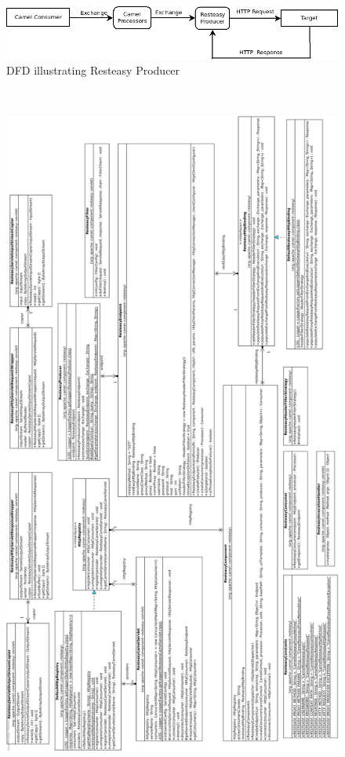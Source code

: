 \documentclass[12pt,final,oneside]{fithesis2}
\begin{document}
\begin{figure}[H]
\includegraphics[width=1.0\linewidth]{diagrams/producer.png}
\caption{DFD illustrating Resteasy Producer}
\label{dfd-prod}
\end{figure}

\begin{figure}[H]\
\centering

\label{class-bla}
\includegraphics[width=1.0\linewidth , height=1.05\textheight]{diagrams/class2.png}

\end{figure}
\end{document}
